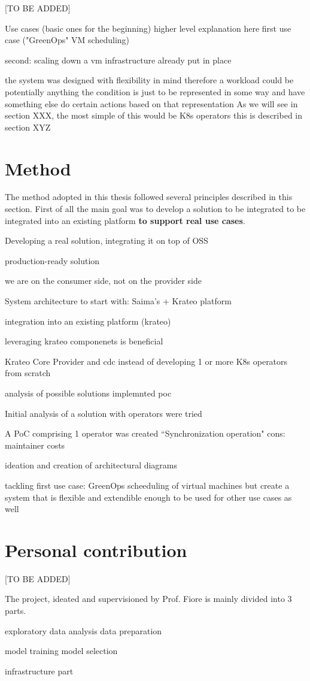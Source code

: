 [TO BE ADDED]

Use cases (basic ones for the beginning) higher level explanation here
first use case ("GreenOps" VM scheduling)

second: scaling down a vm 
infrastructure already put in place

the system was designed with flexibility in mind therefore a workload could be potentially anything
the condition is just to be represented in some way and have something else do certain actions based on that representation
As we will see in section XXX, the most simple of this would be K8s operators
this is described in section XYZ

\section{Method}

The method adopted in this thesis followed several principles described in this section.
First of all the main goal was to develop a solution to be integrated to be integrated into an existing platform \textbf{to support real use cases}.

Developing a real solution, integrating it on top of OSS

production-ready solution

we are on the consumer side, not on the provider side

System architecture to start with: Saima's + Krateo platform

integration into an existing platform (krateo)

leveraging krateo componenets is beneficial 

Krateo Core Provider and cdc instead of developing 1 or more K8s operators from scratch


analysis of possible solutions
implemnted poc 

Initial analysis of a solution with operators were tried

A PoC comprising 1 operator was created 
``Synchronization operation"
cons: maintainer costs

ideation and creation of architectural diagrams

tackling first use case: GreenOps scheeduling of virtual machines
but create a system that is flexible and extendible enough to be used for other use cases as well

\section{Personal contribution}

[TO BE ADDED]

The project, ideated and supervisioned by Prof. Fiore is mainly divided into 3 parts.

exploratory data analysis
data preparation

model training
model selection

infrastructure part



\newpage
